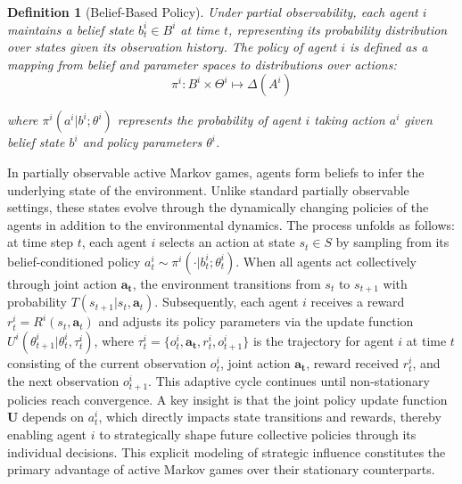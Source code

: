 \documentclass[a4paper,12pt]{report}
\newtheorem{definition}{Definition}
\begin{document}
\begin{definition}[Belief-Based Policy]
    Under partial observability, each agent $i$ maintains a belief state $b_t^i \in B^i$ at time $t$, representing its probability distribution over states given its observation history. The policy of agent $i$ is defined as a mapping from belief and parameter spaces to distributions over actions:
    \begin{equation}
        \pi^i: B^i \times \Theta^i \mapsto \Delta(A^i)
    \end{equation}

    where $\pi^i(a^i|b^i; \theta^i)$ represents the probability of agent $i$ taking action $a^i$ given belief state $b^i$ and policy parameters $\theta^i$.
\end{definition}
\iffalse
    The figure below illustrates the structure of the POAMG framework, highlighting the interplay between states, observations, beliefs, and policy parameters.

    \begin{figure}[htb]
        \centering
        \texttt{[image: figures/poamg-structure.pdf]}
        \caption{Structure of a POAMGshowing the relationships between environment state, observations, beliefs, and policy parameters in a two-agent setting.}
        \label{fig:poamg-structure}
    \end{figure}
\fi

In partially observable active Markov games, agents form beliefs to infer the underlying state of the environment. Unlike standard partially observable settings, these states evolve through the dynamically changing policies of the agents in addition to the environmental dynamics. The process unfolds as follows: at time step $t$, each agent $i$ selects an action at state $s_t \in S$ by sampling from its belief-conditioned policy $a^i_t \sim \pi^i(\cdot|b^i_t; \theta^i_t)$. When all agents act collectively through joint action $\boldsymbol{a_t}$, the environment transitions from $s_t$ to $s_{t+1}$ with probability $T(s_{t+1}|s_t, \boldsymbol{a}_t)$. Subsequently, each agent $i$ receives a reward $r^i_t = R^i(s_t, \boldsymbol{a}_t)$ and adjusts its policy parameters via the update function $U^i(\theta^i_{t+1}|\theta^i_t, \tau^i_t)$, where $\tau^i_t = \{o_t^i, \boldsymbol{a_t}, r^i_t, o_{t+1}^i\}$ is the trajectory for agent $i$ at time $t$ consisting of the current observation $o_t^i$, joint action $\boldsymbol{a_t}$, reward received $r^i_t$, and the next observation $o_{t+1}^i$. This adaptive cycle continues until non-stationary policies reach convergence. A key insight is that the joint policy update function $\boldsymbol{U}$ depends on $a^i_t$, which directly impacts state transitions and rewards, thereby enabling agent $i$ to strategically shape future collective policies through its individual decisions. This explicit modeling of strategic influence constitutes the primary advantage of active Markov games over their stationary counterparts.
\end{document}
